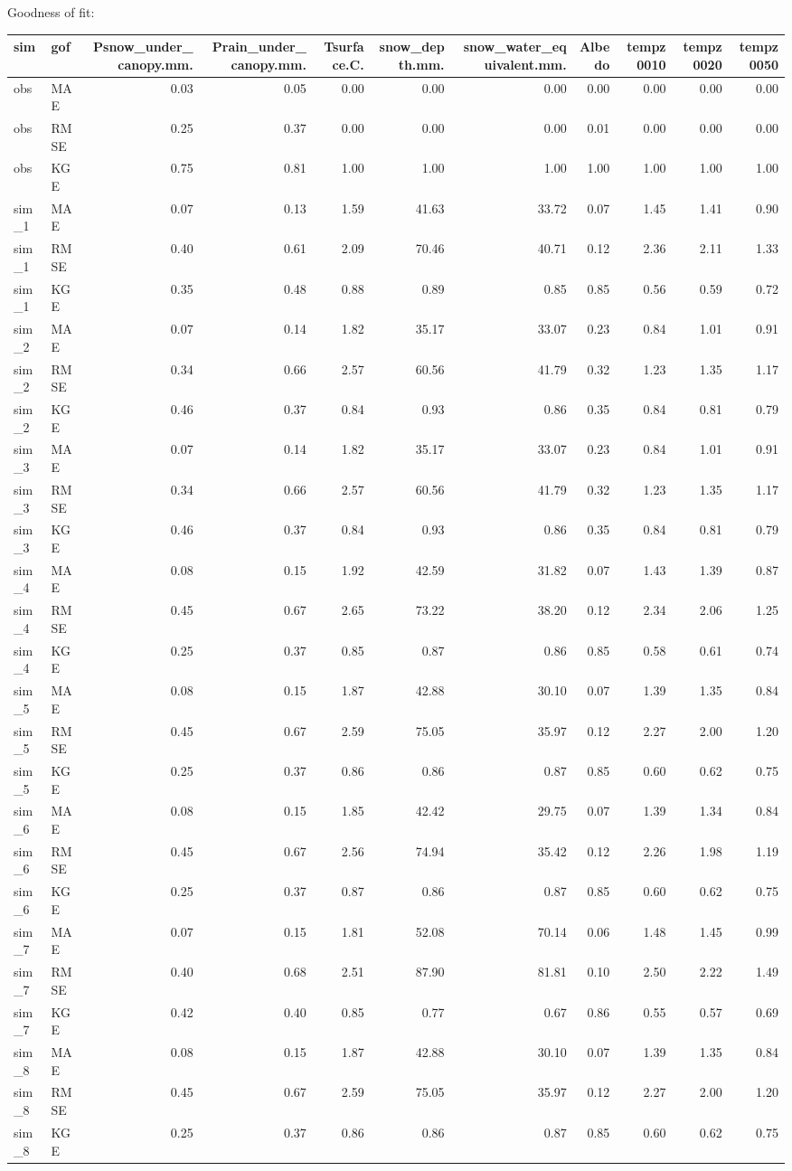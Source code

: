 \documentclass[
]{article}
\begin{document}
Goodness of fit:

\begin{longtable}[]{@{}llrrrrrrrrr@{}}
\toprule
sim & gof & Psnow\_under\_canopy.mm. & Prain\_under\_canopy.mm. &
Tsurface.C. & snow\_depth.mm. & snow\_water\_equivalent.mm. & Albedo &
tempz0010 & tempz0020 & tempz0050\tabularnewline
\midrule
\endhead
obs & MAE & 0.03 & 0.05 & 0.00 & 0.00 & 0.00 & 0.00 & 0.00 & 0.00 &
0.00\tabularnewline
obs & RMSE & 0.25 & 0.37 & 0.00 & 0.00 & 0.00 & 0.01 & 0.00 & 0.00 &
0.00\tabularnewline
obs & KGE & 0.75 & 0.81 & 1.00 & 1.00 & 1.00 & 1.00 & 1.00 & 1.00 &
1.00\tabularnewline
sim\_1 & MAE & 0.07 & 0.13 & 1.59 & 41.63 & 33.72 & 0.07 & 1.45 & 1.41 &
0.90\tabularnewline
sim\_1 & RMSE & 0.40 & 0.61 & 2.09 & 70.46 & 40.71 & 0.12 & 2.36 & 2.11
& 1.33\tabularnewline
sim\_1 & KGE & 0.35 & 0.48 & 0.88 & 0.89 & 0.85 & 0.85 & 0.56 & 0.59 &
0.72\tabularnewline
sim\_2 & MAE & 0.07 & 0.14 & 1.82 & 35.17 & 33.07 & 0.23 & 0.84 & 1.01 &
0.91\tabularnewline
sim\_2 & RMSE & 0.34 & 0.66 & 2.57 & 60.56 & 41.79 & 0.32 & 1.23 & 1.35
& 1.17\tabularnewline
sim\_2 & KGE & 0.46 & 0.37 & 0.84 & 0.93 & 0.86 & 0.35 & 0.84 & 0.81 &
0.79\tabularnewline
sim\_3 & MAE & 0.07 & 0.14 & 1.82 & 35.17 & 33.07 & 0.23 & 0.84 & 1.01 &
0.91\tabularnewline
sim\_3 & RMSE & 0.34 & 0.66 & 2.57 & 60.56 & 41.79 & 0.32 & 1.23 & 1.35
& 1.17\tabularnewline
sim\_3 & KGE & 0.46 & 0.37 & 0.84 & 0.93 & 0.86 & 0.35 & 0.84 & 0.81 &
0.79\tabularnewline
sim\_4 & MAE & 0.08 & 0.15 & 1.92 & 42.59 & 31.82 & 0.07 & 1.43 & 1.39 &
0.87\tabularnewline
sim\_4 & RMSE & 0.45 & 0.67 & 2.65 & 73.22 & 38.20 & 0.12 & 2.34 & 2.06
& 1.25\tabularnewline
sim\_4 & KGE & 0.25 & 0.37 & 0.85 & 0.87 & 0.86 & 0.85 & 0.58 & 0.61 &
0.74\tabularnewline
sim\_5 & MAE & 0.08 & 0.15 & 1.87 & 42.88 & 30.10 & 0.07 & 1.39 & 1.35 &
0.84\tabularnewline
sim\_5 & RMSE & 0.45 & 0.67 & 2.59 & 75.05 & 35.97 & 0.12 & 2.27 & 2.00
& 1.20\tabularnewline
sim\_5 & KGE & 0.25 & 0.37 & 0.86 & 0.86 & 0.87 & 0.85 & 0.60 & 0.62 &
0.75\tabularnewline
sim\_6 & MAE & 0.08 & 0.15 & 1.85 & 42.42 & 29.75 & 0.07 & 1.39 & 1.34 &
0.84\tabularnewline
sim\_6 & RMSE & 0.45 & 0.67 & 2.56 & 74.94 & 35.42 & 0.12 & 2.26 & 1.98
& 1.19\tabularnewline
sim\_6 & KGE & 0.25 & 0.37 & 0.87 & 0.86 & 0.87 & 0.85 & 0.60 & 0.62 &
0.75\tabularnewline
sim\_7 & MAE & 0.07 & 0.15 & 1.81 & 52.08 & 70.14 & 0.06 & 1.48 & 1.45 &
0.99\tabularnewline
sim\_7 & RMSE & 0.40 & 0.68 & 2.51 & 87.90 & 81.81 & 0.10 & 2.50 & 2.22
& 1.49\tabularnewline
sim\_7 & KGE & 0.42 & 0.40 & 0.85 & 0.77 & 0.67 & 0.86 & 0.55 & 0.57 &
0.69\tabularnewline
sim\_8 & MAE & 0.08 & 0.15 & 1.87 & 42.88 & 30.10 & 0.07 & 1.39 & 1.35 &
0.84\tabularnewline
sim\_8 & RMSE & 0.45 & 0.67 & 2.59 & 75.05 & 35.97 & 0.12 & 2.27 & 2.00
& 1.20\tabularnewline
sim\_8 & KGE & 0.25 & 0.37 & 0.86 & 0.86 & 0.87 & 0.85 & 0.60 & 0.62 &
0.75\tabularnewline
\bottomrule
\end{longtable}
\end{document}
